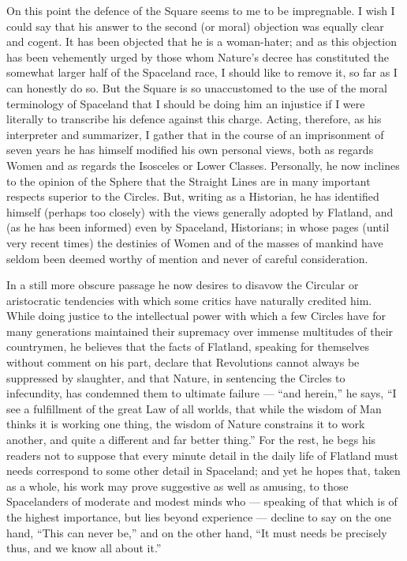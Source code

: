 \documentclass[12pt, a4paper, oneside]{memoir}
\begin{document}
On this point the defence of the Square seems to me to be impregnable. I wish
I could say that his answer to the second (or moral) objection was equally
clear and cogent. It has been objected that he is a woman-hater; and as this
objection has been vehemently urged by those whom Nature's decree has
constituted the somewhat larger half of the Spaceland race, I should like to
remove it, so far as I can honestly do so. But the Square is so unaccustomed
to the use of the moral terminology of Spaceland that I should be doing him an
injustice if I were literally to transcribe his defence against this charge.
Acting, therefore, as his interpreter and summarizer, I gather that in the
course of an imprisonment of seven years he has himself modified his own
personal views, both as regards Women and as regards the Isosceles or Lower
Classes. Personally, he now inclines to the opinion of the Sphere  that the
Straight Lines are in many important respects superior to the
Circles. But, writing as a Historian, he has identified himself (perhaps too
closely) with the views generally adopted by Flatland, and (as he has been
informed) even by Spaceland, Historians; in whose pages (until very recent
times) the destinies of Women and of the masses of mankind have seldom been
deemed worthy of mention and never of careful consideration.

In a still more obscure passage he now desires to disavow the Circular or
aristocratic tendencies with which some critics have naturally credited him.
While doing justice to the intellectual power with which a few Circles have
for many generations maintained their supremacy over immense multitudes of
their countrymen, he believes that the facts of Flatland, speaking for
themselves without comment on his part, declare that Revolutions cannot always
be suppressed by slaughter, and that Nature, in sentencing the Circles to
infecundity, has condemned them to ultimate failure --- ``and herein,'' he says,
``I see a fulfillment of the great Law of all worlds, that while the wisdom of
Man thinks it is working one thing, the wisdom of Nature constrains it to work
another, and quite a different and far better thing.'' For the rest, he begs
his readers not to suppose that every minute detail in the daily life of
Flatland must needs correspond to some other detail in Spaceland; and yet he
hopes that, taken as a whole, his work may prove suggestive as well as
amusing, to those Spacelanders of moderate and modest minds who --- speaking of
that which is of the highest importance, but lies beyond experience --- decline
to say on the one hand, ``This can never be,'' and on the other hand, ``It must
needs be precisely thus, and we know all about it.''
\end{document}
